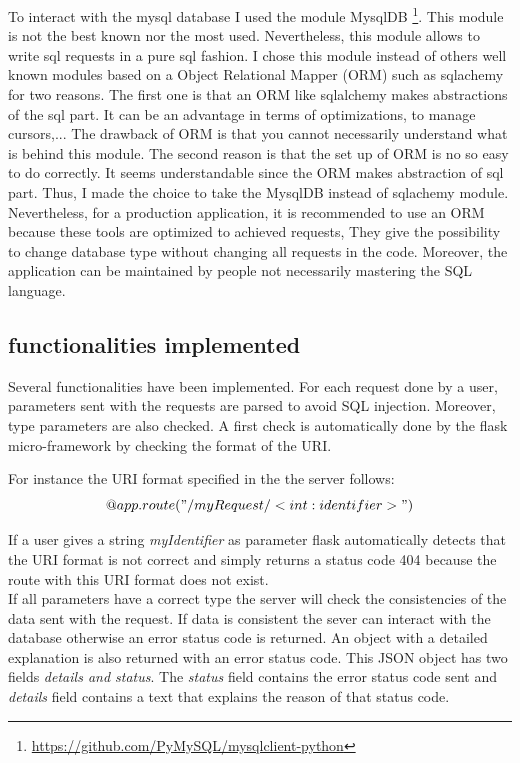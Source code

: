 To interact with the mysql database I used the module MysqlDB \footnote{\url{https://github.com/PyMySQL/mysqlclient-python}}. This module is not the best known nor the most used. Nevertheless, this module allows to write sql requests in a pure sql fashion. I chose this module instead of others well known modules based on a Object Relational Mapper (ORM) such as sqlachemy for two reasons. The first one is that an ORM like sqlalchemy makes abstractions of the sql part. It can be an advantage in terms of optimizations, to manage cursors,... The drawback of ORM is that you cannot necessarily understand what is behind this module. The second reason is that the set up of ORM is no so easy to do correctly. It seems understandable since the ORM makes abstraction of sql part. Thus, I made the choice to take the MysqlDB instead of sqlachemy module. Nevertheless, for a production application, it is recommended to use an ORM because these tools are optimized to achieved requests, They give the possibility to change database type without changing all requests in the code. Moreover, the application can be maintained by people not necessarily mastering the SQL language.
\subsection{functionalities implemented}
Several functionalities have been implemented. For each request done by a user, parameters sent with the requests are parsed to avoid SQL injection. Moreover, type parameters are also checked. A first check is automatically  done by the flask micro-framework by checking the format of the URI.

For instance the URI format specified in the the server follows:
$$ @app.route("/myRequest/<int:identifier>")$$

If a user gives a string \textit{myIdentifier} as parameter flask automatically detects that the URI format is not correct and simply returns a status code 404 because the route with this URI format does not exist.\\

If all parameters have a correct type the server will check the consistencies of the data sent with the request. If data is consistent the sever can interact with the database otherwise an error status code is returned. An object with a detailed explanation is also returned with an error status code. This JSON object has two fields \textit{details and status}. The \textit{status} field contains the error status code sent and \textit{details} field contains a text that explains the reason of that status code.
 
